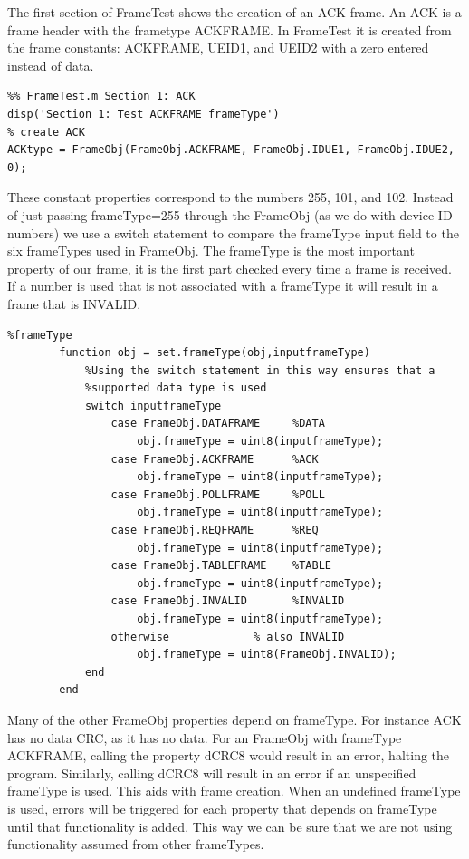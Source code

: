 The first section of FrameTest shows the creation of an ACK frame. An ACK is a frame header with the frametype ACKFRAME. In FrameTest it is created from the frame constants: ACKFRAME, UEID1, and UEID2 with a zero entered instead of data.   

\begin{lstlisting}
%% FrameTest.m Section 1: ACK
disp('Section 1: Test ACKFRAME frameType') 
% create ACK
ACKtype = FrameObj(FrameObj.ACKFRAME, FrameObj.IDUE1, FrameObj.IDUE2, 0);
\end{lstlisting}

These constant properties correspond to the numbers 255, 101, and 102. Instead of just passing frameType=255 through the FrameObj (as we do with device ID numbers) we use a switch statement to compare the frameType input field to the six frameTypes used in FrameObj. The frameType is the most important property of our frame, it is the first part checked every time a frame is received. If a number is used that is not associated with a frameType it will result in a frame that is INVALID.

\begin{lstlisting} 
%frameType
        function obj = set.frameType(obj,inputframeType)
            %Using the switch statement in this way ensures that a
            %supported data type is used
            switch inputframeType
                case FrameObj.DATAFRAME     %DATA
                    obj.frameType = uint8(inputframeType);
                case FrameObj.ACKFRAME      %ACK
                    obj.frameType = uint8(inputframeType);
                case FrameObj.POLLFRAME     %POLL
                    obj.frameType = uint8(inputframeType);
                case FrameObj.REQFRAME      %REQ
                    obj.frameType = uint8(inputframeType);
                case FrameObj.TABLEFRAME    %TABLE
                    obj.frameType = uint8(inputframeType);
                case FrameObj.INVALID       %INVALID
                    obj.frameType = uint8(inputframeType);
                otherwise             % also INVALID
                    obj.frameType = uint8(FrameObj.INVALID);
            end
        end
\end{lstlisting}

Many of the other FrameObj properties depend on frameType. For instance ACK has no data CRC, as it has no data. For an FrameObj with frameType ACKFRAME, calling the property dCRC8 would result in an error, halting the program. Similarly, calling dCRC8 will result in an error if an unspecified frameType is used. This aids with frame creation. When an undefined frameType is used, errors will be triggered for each property that depends on frameType until that functionality is added. This way we can be sure that we are not using functionality assumed from other frameTypes. 

